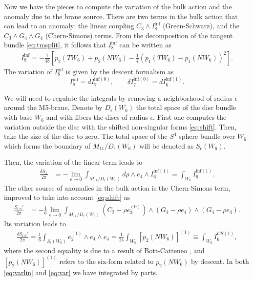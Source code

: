 \documentclass[a4paper,11pt]{article}
\newcommand{\ba}[1]{\begin{align} #1 \end{align} }
\begin{document}
Now we have the pieces to compute the variation of the bulk action and the anomaly due to the brane source. There are two terms in the bulk action that can lead to an anomaly: the linear coupling $C_3\wedge I_8^{\text{inf}}$ (Green-Schwarz), and the $C_3\wedge G_4\wedge G_4$ (Chern-Simons) terms. From the decomposition of the tangent bundle \eqref{eq:tmsplit}, it follows that $I_8^{\text{inf}}$ can be written as
	\ba{
	I_8^{\text{inf}} = -\frac{1}{48} \left[ p_2(TW_6) +p_2(NW_6) -\frac{1}{4} \left(p_1(TW_6)-p_1(NW_6)\right)^2\right].
	}
The variation of $I_8^{\text{inf}}$ is given by the descent formalism as 
\begin{equation}
	I_8^{\inf} = d I_7^{\text{inf}(0)}, \qquad \delta I_7^{\text{inf}(0)} = d I_6^{\text{inf}(1)}.
	\end{equation} 	

We will need to regulate the integrals by removing a neighborhood of radius $\epsilon$ around the M5-brane. Denote by $D_\epsilon(W_6)$ the total space of the disc bundle with base $W_6$ and with fibers the discs of radius $\epsilon$. First one computes the variation outside the disc with the shifted non-singular forms \eqref{eq:shift}. Then, take the size of the disc to zero. The total space of the $S^4$ sphere bundle over $W_6$ which forms the boundary of $M_{11}/D_{\epsilon}(W_6)$ will be denoted as $S_\epsilon(W_6)$. 
\begin{comment}	
The variation of the linear term goes as follows,
\begin{align}
	\frac{\delta S_{L}}{2\pi } &= \lim_{\epsilon\to 0} \int_{M_{11}/D_\epsilon(W_6)} d\left(C_3 - \rho e_3^{0} \right) \wedge \delta I_7^{\text{inf}(0)} \\
	&=-\lim_{\epsilon\to 0} \int_{M_{11}/D_\epsilon(W)}  d\rho \wedge e_4 \wedge I_6^{\text{inf}(1)} = \int_{W}I_6^{\text{inf}(1)}. \label{eq:varlin}
\end{align}
In the first equality we integrated by parts, and in the second equality we dropped the $C_3$ term since it is exact.
\end{comment}
Then, the variation of the linear term leads to
\begin{align}
	\frac{\delta S_{L}}{2\pi } &=-\lim_{\epsilon\to 0} \int_{M_{11}/D_\epsilon(W_6)}  d\rho \wedge e_4 \wedge I_6^{\text{inf}(1)} = \int_{W_6}I_6^{\text{inf}(1)}. \label{eq:varlin}
\end{align}
The other source of anomalies in the bulk action is the Chern-Simons term, improved to take into account \eqref{eq:shift} as
	\ba{
	\frac{S_{CS}'}{2\pi}&=-{\frac{1}{6}}\lim_{\epsilon\to 0} \int_{M_{11}/D_\epsilon(W_6)} \left(C_3 -\rho e_3^{(0)} \right) \wedge \left(G_4 -\rho e_4 \right) \wedge \left(G_4 -\rho e_4 \right).  \label{eq:modifiedc}
	}
Its variation leads to
	\ba{
	\frac{\delta S_{CS}'}{2\pi} = \frac{1}{{6}} \int_{S_\epsilon(W_6)} e_2^{(1)}\wedge e_4 \wedge e_4   =  \frac{1}{24} \int_{W_6} \left[p_2(NW_6)\right]^{(1)}\equiv \int_{W_6} I_6^{CS(1)}, \label{eq:var}
	}
where the second equality is due to a result of Bott-Catteneo \cite{bott1999integral}, and $\left[p_2(NW_6)\right]^{(1)}$ refers to the six-form related to $p_2(NW_6)$ by descent. In both \eqref{eq:varlin} and \eqref{eq:var} we have integrated by parts.
\end{document}
